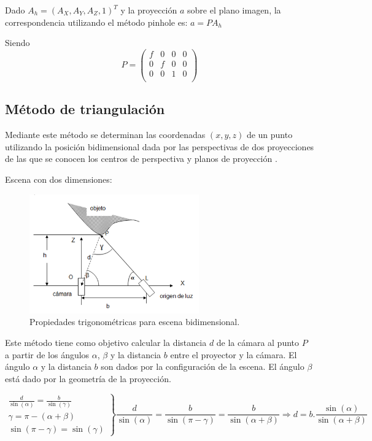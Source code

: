 Dado $A_h = (A_X,A_Y,A_Z,1)^T$ y la proyección $a$ sobre el plano imagen, la correspondencia utilizando el método pinhole es:
$a=PA_h$

Siendo
\[
P = 
\begin{pmatrix}
f & 0 & 0 & 0 \\
0 & f & 0 & 0 \\
0 & 0 & 1 & 0 \\
\end{pmatrix}
\]

\subsection{Método de triangulación}

Mediante este método se determinan las coordenadas $(x,y,z)$ de un punto utilizando la posición bidimensional dada por las perspectivas de dos proyecciones de las que se conocen los centros de perspectiva y planos de proyección \cite{PresUnivYonsei}.

Escena con dos dimensiones:

\begin{figure}[H]
  \centering
    \includegraphics[width=0.65\textwidth]{./Cap6_reconstruccion/triangulacion.PNG}
  \caption{Propiedades trigonométricas para escena bidimensional.}%
  \label{fig:Triangulacion}
\end{figure}

Este método tiene como objetivo calcular la distancia $d$ de la cámara al punto $P$ a partir de los ángulos $\alpha$, $\beta$ y la distancia $b$ entre el proyector y la cámara.
El ángulo $\alpha$ y la distancia $b$ son dados por la configuración de la escena.
El ángulo $\beta$ está dado por la geometría de la proyección.

\[
\left.
\begin{array}{l}
\frac{d}{\sin (\alpha)} = \frac{b}{\sin (\gamma)} 	\\
\gamma = \pi - (\alpha + \beta)						\\
\sin (\pi - \gamma) = \sin (\gamma)
\end{array}
\right \rbrace
\frac{d}{\sin(\alpha)} = \frac{b}{\sin(\pi - \gamma)} = \frac{b}{\sin(\alpha + \beta)} \Rightarrow d = b . \frac{\sin(\alpha)}{\sin(\alpha + \beta)}
\]

